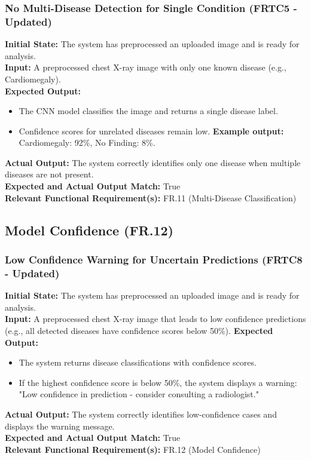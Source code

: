 \documentclass[12pt, titlepage]{article}
\begin{document}
\subsubsection{No Multi-Disease Detection for Single Condition (FRTC5 - Updated)}
\textbf{Initial State:} The system has preprocessed an uploaded image and is ready for analysis.\\
\textbf{Input:} A preprocessed chest X-ray image with only one known disease (e.g., Cardiomegaly).\\
\textbf{Expected Output:}
\begin{itemize}
\item The CNN model classifies the image and returns a single disease label.
\item Confidence scores for unrelated diseases remain low.
\textbf{Example output:} Cardiomegaly: 92\%, No Finding: 8\%.
\end{itemize}
\textbf{Actual Output:} The system correctly identifies only one disease when multiple diseases are not present.\\
\textbf{Expected and Actual Output Match:} True\\
\textbf{Relevant Functional Requirement(s):} FR.11 (Multi-Disease Classification)\\

\subsection{Model Confidence (FR.12)}
\subsubsection{Low Confidence Warning for Uncertain Predictions (FRTC8 - Updated)}
\textbf{Initial State:} The system has preprocessed an uploaded image and is ready for analysis.\\
\textbf{Input:} A preprocessed chest X-ray image that leads to low confidence predictions (e.g., all detected diseases have confidence scores below 50\%).
\textbf{Expected Output:}
\begin{itemize}
\item The system returns disease classifications with confidence scores.
\item If the highest confidence score is below 50\%, the system displays a warning: "Low confidence in prediction - consider consulting a radiologist."
\end{itemize}
\textbf{Actual Output:} The system correctly identifies low-confidence cases and displays the warning message.\\
\textbf{Expected and Actual Output Match:} True\\
\textbf{Relevant Functional Requirement(s):} FR.12 (Model Confidence)\\
\end{document}
